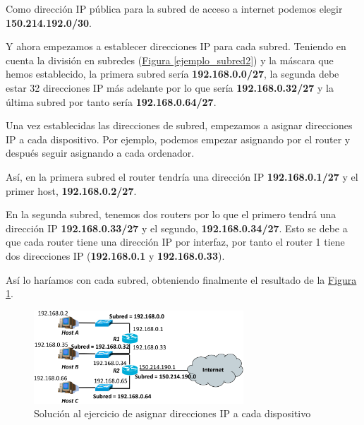 \documentclass[10pt,a4paper,spanish]{report}
\begin{document}
Como dirección IP pública para la subred de acceso a internet podemos elegir \textbf{\textcolor{tema4}{150.214.192.0/30}}.

Y ahora empezamos a establecer direcciones IP para cada subred. Teniendo en cuenta la división en subredes (\hyperref[ejemplo_subred2]{Figura \ref*{ejemplo_subred2}}) y la máscara que hemos establecido, la primera subred sería \textcolor{tema4}{\textbf{192.168.0.0/27}}, la segunda debe estar 32 direcciones IP más adelante por lo que sería \textcolor{tema4}{\textbf{192.168.0.32/27}} y la última subred por tanto sería \textbf{\textcolor{tema4}{192.168.0.64/27}}.

Una vez establecidas las direcciones de subred, empezamos a asignar direcciones IP a cada dispositivo. Por ejemplo, podemos empezar asignando por el router y después seguir asignando a cada ordenador. 

Así, en la primera subred el router tendría una dirección IP \textbf{\textcolor{tema4}{192.168.0.1/27}} y el primer host, \textbf{\textcolor{tema4}{192.168.0.2/27}}.

En la segunda subred, tenemos dos routers por lo que el primero tendrá una dirección IP \textbf{\textcolor{tema4}{192.168.0.33/27}} y el segundo, \textbf{\textcolor{tema4}{192.168.0.34/27}}. Esto se debe a que cada router tiene una dirección IP por interfaz, por tanto el router 1 tiene dos direcciones IP (\textbf{\textcolor{tema4}{192.168.0.1}} y \textbf{\textcolor{tema4}{192.168.0.33}}). 

Así lo haríamos con cada subred, obteniendo finalmente el resultado de la \hyperref[solucion_asignarip]{Figura \ref*{solucion_asignarip}}.

\begin{figure}[!h]
  \centering
  \includegraphics[width=0.7\textwidth]{solucion_asignarip}
  \caption{Solución al ejercicio de asignar direcciones IP a cada dispositivo}
  \label{solucion_asignarip}
\end{figure}
\end{document}
